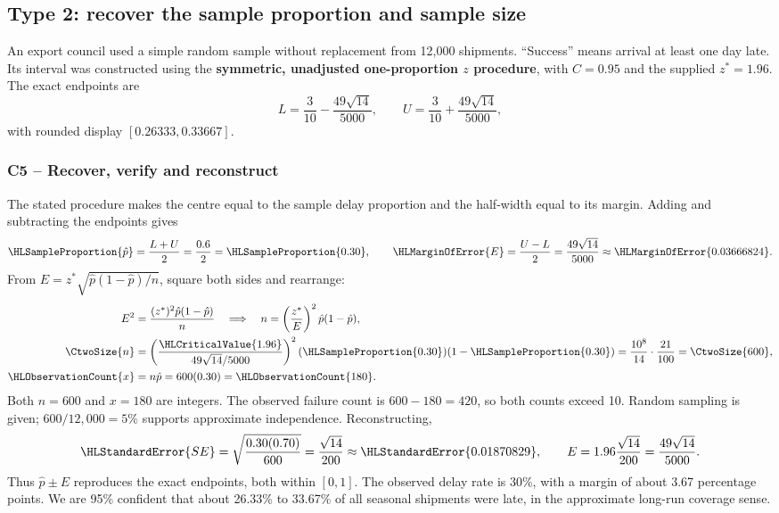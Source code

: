 \subsection{Type 2: recover the sample proportion and sample size}\label{prob:c5-2}
An export council used a simple random sample without replacement from 12,000 shipments. ``Success'' means arrival at least one day late. Its interval was constructed using the \textbf{symmetric, unadjusted one-proportion $z$ procedure}, with $C=0.95$ and the supplied $z^*=1.96$. The exact endpoints are
\[
L=\frac{3}{10}-\frac{49\sqrt{14}}{5000},\qquad
U=\frac{3}{10}+\frac{49\sqrt{14}}{5000},
\]
with rounded display $[0.26333,0.33667]$.
\subsubsection*{C5 -- Recover, verify and reconstruct}\label{sol:c5-2-a}
The stated procedure makes the centre equal to the sample delay proportion and the half-width equal to its margin. Adding and subtracting the endpoints gives
\[
\HLSampleProportion{\hat p}=\frac{L+U}{2}=\frac{0.6}{2}=\HLSampleProportion{0.30},\qquad
\HLMarginOfError{E}=\frac{U-L}{2}=\frac{49\sqrt{14}}{5000}\approx\HLMarginOfError{0.03666824}.
\]
From $E=z^*\sqrt{\hat p(1-\hat p)/n}$, square both sides and rearrange:
\begin{align*}
E^2&=\frac{(z^*)^2\hat p(1-\hat p)}{n}
\quad\Longrightarrow\quad n=\left(\frac{z^*}{E}\right)^2\hat p(1-\hat p),\\
\CtwoSize{n}&=\left(\frac{\HLCriticalValue{1.96}}{49\sqrt{14}/5000}\right)^2
(\HLSampleProportion{0.30})(1-\HLSampleProportion{0.30})
=\frac{10^8}{14}\cdot\frac{21}{100}=\CtwoSize{600},\\
\HLObservationCount{x}&=n\hat p=600(0.30)=\HLObservationCount{180}.
\end{align*}
Both $n=600$ and $x=180$ are integers. The observed failure count is $600-180=420$, so both counts exceed 10. Random sampling is given; $600/12{,}000=5\%$ supports approximate independence. Reconstructing,
\[
\HLStandardError{SE}=\sqrt{\frac{0.30(0.70)}{600}}=\frac{\sqrt{14}}{200}
\approx\HLStandardError{0.01870829},\qquad
E=1.96\frac{\sqrt{14}}{200}=\frac{49\sqrt{14}}{5000}.
\]
Thus $\hat p\pm E$ reproduces the exact endpoints, both within $[0,1]$. The observed delay rate is 30\%, with a margin of about 3.67 percentage points. We are 95\% confident that about 26.33\% to 33.67\% of all seasonal shipments were late, in the approximate long-run coverage sense.

